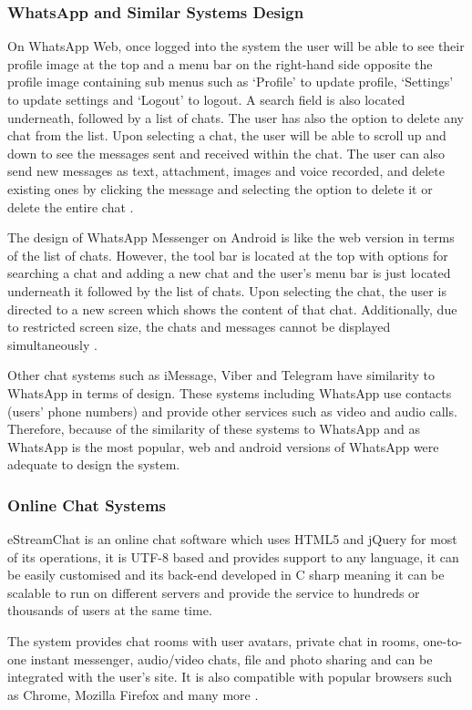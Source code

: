 \documentclass{article}
\begin{document}
\subsubsection{WhatsApp and Similar Systems Design}
On WhatsApp Web, once logged into the system the user will be able to see their profile image at the top and a menu bar on the right-hand side opposite the profile image containing sub menus such as ‘Profile’ to update profile, ‘Settings’ to update settings and ‘Logout’ to logout. A search field is also located underneath, followed by a list of chats. The user has also the option to delete any chat from the list. Upon selecting a chat, the user will be able to scroll up and down to see the messages sent and received within the chat. The user can also send new messages as text, attachment, images and voice recorded, and delete existing ones by clicking the message and selecting the option to delete it or delete the entire chat \cite{WhatsApp3}. \par
The design of WhatsApp Messenger on Android is like the web version in terms of the list of chats. However, the tool bar is located at the top with options for searching a chat and adding a new chat and the user’s menu bar is just located underneath it followed by the list of chats. Upon selecting the chat, the user is directed to a new screen which shows the content of that chat. Additionally, due to restricted screen size, the chats and messages cannot be displayed simultaneously \cite{WhatsApp2}. \par
Other chat systems such as iMessage, Viber and Telegram have similarity to WhatsApp in terms of design. These systems including WhatsApp use contacts (users’ phone numbers) and provide other services such as video and audio calls. Therefore, because of the similarity of these systems to WhatsApp and as WhatsApp is the most popular, web and android versions of WhatsApp were adequate to design the system. 


\subsubsection{Online Chat Systems}
eStreamChat is an online chat software which uses HTML5 and jQuery for most of its operations, it is UTF-8 based and provides support to any language, it can be easily customised and its back-end developed in C sharp meaning it can be scalable to run on different servers and provide the service to hundreds or thousands of users at the same time. \par
The system provides chat rooms with user avatars, private chat in rooms, one-to-one instant messenger, audio/video chats, file and photo sharing and can be integrated with the user’s site. It is also compatible with popular browsers such as Chrome, Mozilla Firefox and many more \cite{eStreamChat}. 
\end{document}
